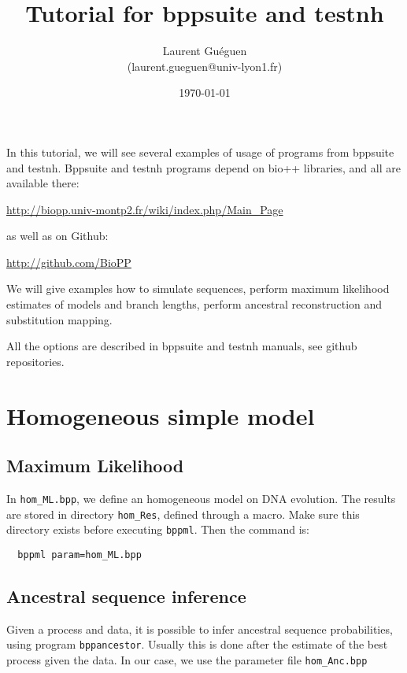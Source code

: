 \documentclass{article}
\title{Tutorial for bppsuite and testnh}
\date{\today}
\author{Laurent Guéguen \\ {\small (laurent.gueguen@univ-lyon1.fr)}}
\begin{document}
\maketitle
\thispagestyle{empty}

\medskip 


In this tutorial, we will see several examples of usage of programs
from bppsuite and testnh. Bppsuite and testnh programs depend on bio++
libraries, and all are available there:

\url{http://biopp.univ-montp2.fr/wiki/index.php/Main_Page}

as well as on Github:

\url{http://github.com/BioPP}

\medskip

We will give examples how to simulate sequences, perform maximum
likelihood estimates of models and branch lengths, perform ancestral
reconstruction and substitution mapping.

All the options are described in bppsuite and testnh manuals, see
github repositories. 


\section{Homogeneous simple model}

\subsection*{Maximum Likelihood}

In \texttt{hom\_ML.bpp}, we define an homogeneous model on DNA evolution.
The results are stored in directory \texttt{hom\_Res}, defined through
a macro. Make sure this directory exists before executing
\texttt{bppml}. Then the command is:

\begin{verbatim}
  bppml param=hom_ML.bpp
\end{verbatim}

\subsection*{Ancestral sequence inference}

Given a process and data, it is possible to infer ancestral sequence
probabilities, using program \texttt{bppancestor}. Usually this is
done after the estimate of the best process given the data. In our
case, we use the parameter file \texttt{hom\_Anc.bpp}
\end{document}
